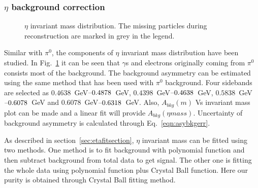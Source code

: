 \subsubsection{\texorpdfstring{$\eta$ background correction}{eta background correction}}
\begin{figure}[H]
  \centering     
  \caption{$\eta$ invariant mass distribution. The missing particles during reconstruction are marked in grey in the legend.}
  \label{fig:etacomponent}
\end{figure}
Similar with $\pi^0$, the components of $\eta$ invariant mass distribution have been studied. In Fig.~\ref{fig:etacomponent} it can be seen that $\gamma$s and electrons originally coming from $\pi^0$ consists most of the background. The background asymmetry can be estimated using the same method that has been used with $\pi^0$ background. Four sidebands are selected as $0.4638$~GeV$\textup{--}0.4878$~GeV, $0.4398$~GeV$\textup{--}0.4638$~GeV, $0.5838$~GeV$\textup{--}0.6078$~GeV and $0.6078$~GeV$\textup{--}0.6318$~GeV. Also, $A_{bkg}(m)$ Vs invariant mass plot can be made and a linear fit will provide $A_{bkg}(\eta  mass)$. Uncertainty of background asymmetry is calculated through Eq.~\eqref{eqn:asybkgerr}.

As described in section~\ref{sec:etafitsection}, $\eta$ invariant mass can be fitted using two methods. One method is to fit background with polynomial function and then subtract background from total data to get signal. The other one is fitting the whole data using polynomial function plus Crystal Ball function. Here our purity is obtained through Crystal Ball fitting method.%

